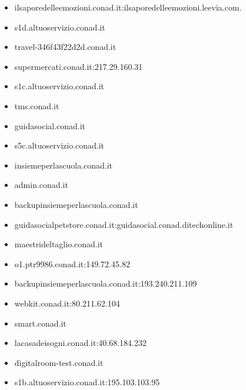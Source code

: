 \documentclass{article}
\begin{document}
\begin{itemize}
        \item ilsaporedelleemozioni.conad.it:ilsaporedelleemozioni.leevia.com.
    
        \item s1d.altuoservizio.conad.it
    
        \item travel-346f43f22d2d.conad.it
    
        \item supermercati.conad.it:217.29.160.31
    
        \item s1c.altuoservizio.conad.it
    
        \item tms.conad.it
    
        \item guidasocial.conad.it
    
        \item s5c.altuoservizio.conad.it
    
        \item insiemeperlascuola.conad.it
    
        \item admin.conad.it
    
        \item backupinsiemeperlascuola.conad.it
    
        \item guidasocialpetstore.conad.it:guidasocial.conad.ditechonline.it
    
        \item maestrideltaglio.conad.it
    
        \item o1.ptr9986.conad.it:149.72.45.82
    
        \item backupinsiemeperlascuola.conad.it:193.240.211.109
    
        \item webkit.conad.it:80.211.62.104
    
        \item smart.conad.it
    
        \item lacasadeisogni.conad.it:40.68.184.232
    
        \item digitalroom-test.conad.it
    
        \item s1b.altuoservizio.conad.it:195.103.103.95
    

\end{itemize}
\end{document}
